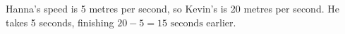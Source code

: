 Hanna's speed is 5 metres per second, so Kevin's is 20 metres per second. He takes 5 seconds, finishing $20-5=\boxed{15\text{ seconds}}$ earlier.
